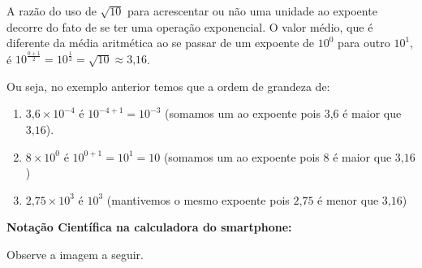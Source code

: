 A razão do uso de $\sqrt{10}$ para acrescentar ou não uma unidade ao expoente decorre do fato de se ter uma operação exponencial. O valor médio, que é diferente da média aritmética ao se passar de um expoente de $10^0$ para outro $10^1$, é ${10}^\frac{0+1}{2}{=10}^\frac{1}{2}=\sqrt{10} \approx 3\text{,}16$.

\begin{example}{}

Ou seja, no exemplo anterior temos que a ordem de grandeza de:
\begin{enumerate}
\item {} 
$3\text{,}6 \times 10^{-4}$  é  $10^{-4+1} = 10^{-3}$ (somamos um ao expoente pois $3\text{,}6$ é maior que $3\text{,}16$).

\item {} 
$8 \times 10^0$ é  $10^{0+1} = 10^1 = 10$ (somamos um ao expoente pois $8$ é maior que $3\text{,}16$)

\item {} 
$2\text{,}75 \times 10^3$ é $10^3$  (mantivemos o mesmo expoente pois $2\text{,}75$ é menor que $3\text{,}16$)

\end{enumerate}
\end{example}

\textbf{Notação Científica na calculadora do smartphone:}

Observe a imagem a seguir.

